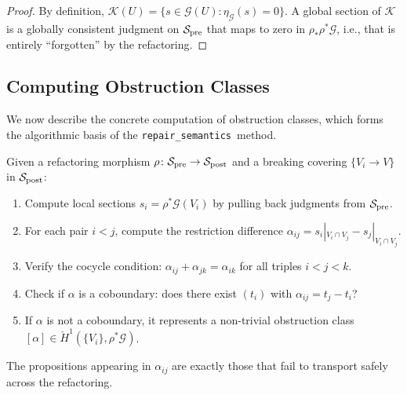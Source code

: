 \documentclass[11pt]{article}
\newcommand{\RepairSem}{\texttt{repair\_semantics}}
\newcommand{\SitePre}{\Site_{\mathrm{pre}}}
\newcommand{\SitePost}{\Site_{\mathrm{post}}}
\newcommand{\RefactorMorph}{\rho}
\begin{document}
\begin{proof}
By definition, $\mathcal{K}(U) = \{s \in \mathcal{G}(U) :
\eta_{\mathcal{G}}(s) = 0\}$.  A global section of $\mathcal{K}$ is
a globally consistent judgment on $\SitePre$ that maps to zero in
$\RefactorMorph_*\RefactorMorph^*\mathcal{G}$, i.e., that is
entirely ``forgotten'' by the refactoring.
\end{proof}

\subsection{Computing Obstruction Classes}\label{ssec:compute-obstruction}

We now describe the concrete computation of obstruction classes, which
forms the algorithmic basis of the \RepairSem\ method.

\begin{construction}\label{con:obstruction-compute}
Given a refactoring morphism $\RefactorMorph \colon \SitePre \to
\SitePost$ and a breaking covering $\{V_i \to V\}$ in $\SitePost$:
\begin{enumerate}[noitemsep]
  \item Compute local sections $s_i = \RefactorMorph^*\mathcal{G}(V_i)$
        by pulling back judgments from $\SitePre$.
  \item For each pair $i < j$, compute the restriction difference
        $\alpha_{ij} = s_i|_{V_i \cap V_j} - s_j|_{V_i \cap V_j}$.
  \item Verify the cocycle condition:
        $\alpha_{ij} + \alpha_{jk} = \alpha_{ik}$ for all triples
        $i < j < k$.
  \item Check if $\alpha$ is a coboundary: does there exist
        $(t_i)$ with $\alpha_{ij} = t_j - t_i$?
  \item If $\alpha$ is not a coboundary, it represents a non-trivial
        obstruction class $[\alpha] \in \check{H}^1(\{V_i\},
        \RefactorMorph^*\mathcal{G})$.
\end{enumerate}
The propositions appearing in $\alpha_{ij}$ are exactly those that
fail to transport safely across the refactoring.
\end{construction}
\end{document}
